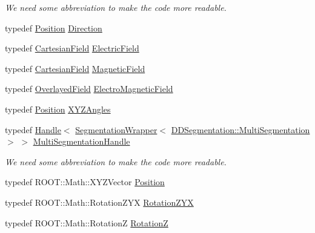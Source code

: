 \begin{DoxyCompactItemize}
\begin{DoxyCompactList}\small\item\em We need some abbreviation to make the code more readable. \end{DoxyCompactList}\item 
typedef \hyperlink{namespace_d_d4hep_1_1_geometry_a55083902099d03506c6db01b80404900}{Position} \hyperlink{namespace_d_d4hep_1_1_geometry_a56730a0ddb9f3f089c415cd693bd7c19}{Direction}
\item 
typedef \hyperlink{class_d_d4hep_1_1_geometry_1_1_cartesian_field}{Cartesian\+Field} \hyperlink{namespace_d_d4hep_1_1_geometry_a2562a0506900761fa410a92b8d41e665}{Electric\+Field}
\item 
typedef \hyperlink{class_d_d4hep_1_1_geometry_1_1_cartesian_field}{Cartesian\+Field} \hyperlink{namespace_d_d4hep_1_1_geometry_a4335218852430195169d47112d47dde6}{Magnetic\+Field}
\item 
typedef \hyperlink{class_d_d4hep_1_1_geometry_1_1_overlayed_field}{Overlayed\+Field} \hyperlink{namespace_d_d4hep_1_1_geometry_a6c49b16dfc8e9487329bfa3b45329f63}{Electro\+Magnetic\+Field}
\item 
typedef \hyperlink{namespace_d_d4hep_1_1_geometry_a55083902099d03506c6db01b80404900}{Position} \hyperlink{namespace_d_d4hep_1_1_geometry_ab195c63789d4928d291d3b5522151aaa}{X\+Y\+Z\+Angles}
\item 
typedef \hyperlink{class_d_d4hep_1_1_handle}{Handle}$<$ \hyperlink{class_d_d4hep_1_1_geometry_1_1_segmentation_wrapper}{Segmentation\+Wrapper}$<$ \hyperlink{class_d_d4hep_1_1_d_d_segmentation_1_1_multi_segmentation}{D\+D\+Segmentation\+::\+Multi\+Segmentation} $>$ $>$ \hyperlink{namespace_d_d4hep_1_1_geometry_a0cddd542681c17a184500750327bcb64}{Multi\+Segmentation\+Handle}
\begin{DoxyCompactList}\small\item\em We need some abbreviation to make the code more readable. \end{DoxyCompactList}\item 
typedef R\+O\+O\+T\+::\+Math\+::\+X\+Y\+Z\+Vector \hyperlink{namespace_d_d4hep_1_1_geometry_a55083902099d03506c6db01b80404900}{Position}
\item 
typedef R\+O\+O\+T\+::\+Math\+::\+Rotation\+Z\+YX \hyperlink{namespace_d_d4hep_1_1_geometry_a24667b2b9c3cec3d5239828db4d52189}{Rotation\+Z\+YX}
\item 
typedef R\+O\+O\+T\+::\+Math\+::\+RotationZ \hyperlink{namespace_d_d4hep_1_1_geometry_ac5c5b2c9ea8e14caecff444e8f9678ec}{RotationZ}

\end{DoxyCompactItemize}
